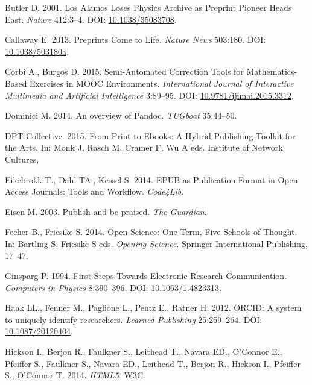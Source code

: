 \documentclass[10pt,fleqn]{wlpeerj}
\begin{document}
\hypertarget{ref-butlerux5falamosux5f2001}{}
Butler D. 2001. Los Alamos Loses Physics Archive as Preprint Pioneer
Heads East. \emph{Nature} 412:3--4. DOI:
\href{https://doi.org/10.1038/35083708}{10.1038/35083708}.

\hypertarget{ref-callawayux5fpreprintsux5f2013}{}
Callaway E. 2013. Preprints Come to Life. \emph{Nature News} 503:180.
DOI: \href{https://doi.org/10.1038/503180a}{10.1038/503180a}.

\hypertarget{ref-garnetux5fsemiautomaticux5f2015}{}
Corbí A., Burgos D. 2015. Semi-Automated Correction Tools for
Mathematics-Based Exercises in MOOC Environments. \emph{International
Journal of Interactive Multimedia and Artificial Intelligence} 3:89--95.
DOI:
\href{https://doi.org/10.9781/ijimai.2015.3312}{10.9781/ijimai.2015.3312}.

\hypertarget{ref-dominiciux5fpandocux5f2014}{}
Dominici M. 2014. An overview of Pandoc. \emph{TUGboat} 35:44--50.

\hypertarget{ref-dptcollectiveux5ftoolkitux5f2015}{}
DPT Collective. 2015. From Print to Ebooks: A Hybrid Publishing Toolkit
for the Arts. In: Monk J, Rasch M, Cramer F, Wu A eds. Institute of
Network Cultures,

\hypertarget{ref-eikebrokkux5fepubux5f2014}{}
Eikebrokk T., Dahl TA., Kessel S. 2014. EPUB as Publication Format in
Open Access Journals: Tools and Workflow. \emph{Code4Lib}.

\hypertarget{ref-eisenux5fpublishux5f2003}{}
Eisen M. 2003. Publish and be praised. \emph{The Guardian}.

\hypertarget{ref-fecherux5fopenux5f2014}{}
Fecher B., Friesike S. 2014. Open Science: One Term, Five Schools of
Thought. In: Bartling S, Friesike S eds. \emph{Opening Science}.
Springer International Publishing, 17--47.

\hypertarget{ref-ginspargux5ffirstux5f1994}{}
Ginsparg P. 1994. First Steps Towards Electronic Research Communication.
\emph{Computers in Physics} 8:390--396. DOI:
\href{https://doi.org/10.1063/1.4823313}{10.1063/1.4823313}.

\hypertarget{ref-haakux5forcidux5f2012}{}
Haak LL., Fenner M., Paglione L., Pentz E., Ratner H. 2012. ORCID: A
system to uniquely identify researchers. \emph{Learned Publishing}
25:259--264. DOI:
\href{https://doi.org/10.1087/20120404}{10.1087/20120404}.

\hypertarget{ref-HTML5}{}
Hickson I., Berjon R., Faulkner S., Leithead T., Navara ED., O'Connor
E., Pfeiffer S., Faulkner S., Navara ED., Leithead T., Berjon R.,
Hickson I., Pfeiffer S., O'Connor T. 2014. \emph{HTML5}. W3C.
\end{document}
